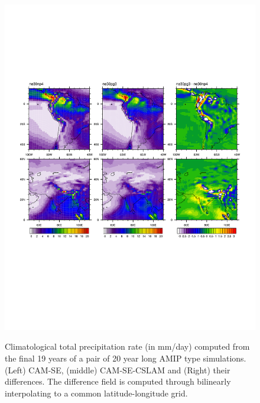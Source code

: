 \documentclass[twocol]{ametsoc}
\begin{document}
\begin{figure}[t]
\noindent\includegraphics[width=37pc,angle=0]{figs/AMIP_regional.pdf}\\
\caption{Climatological total precipitation rate (in mm/day) computed from the final 19 years of a pair of 20 year long AMIP type simulations. (Left) CAM-SE, (middle) CAM-SE-CSLAM and (Right) their differences. The difference field is computed through bilinearly interpolating to a common latitude-longitude grid.}
\label{fig:AMIP-region}
\end{figure}
\end{document}
